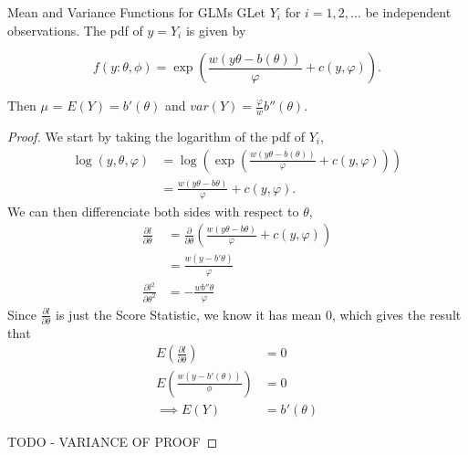 \begin{theorem}{Mean and Variance Functions for GLMs}
    GLet $Y_i$ for $i = 1,2,\ldots$ be independent observations. The pdf of $y = Y_i$ is given by 

    \[
    f(y:\theta,\phi) = \exp\left( \frac{w(y\theta - b(\theta))}{\varphi} + c(y, \varphi)\right). 
    \]

    Then $\mu$ = $E(Y) = b'(\theta)$ and $var(Y) = \frac{\varphi}{w}b''(\theta)$.
\end{theorem}
\begin{proof}
    We start by taking the logarithm of the pdf of $Y_i$,
    \begin{align*}
        \log(y, \theta, \varphi) &= \log(\exp\left( \frac{w(y\theta - b(\theta))}{\varphi} + c(y, \varphi)\right)) \\
                                 &= \frac{w(y\theta - b\theta)}{\varphi} + c(y, \varphi).
    \end{align*}
    We can then differenciate both sides with respect to $\theta$,
    \begin{align*}
        \frac{\partial l}{\partial \theta} &= \frac{\partial }{\partial \theta} \left(\frac{w(y\theta - b\theta)}{\varphi} + c(y, \varphi) \right) \\
        &= \frac{w(y - b'\theta)}{\varphi}  \\
        \frac{\partial l^2}{\partial \theta^2} &= -\frac{wb''\theta}{\varphi}
    \end{align*}
    Since $\frac{\partial l}{\partial \theta}$ is just the Score Statistic, we know it has mean 0, which gives the result that 
    \begin{align*}
        E\left( \frac{\partial l}{\partial \theta}\right)  &= 0 \\ 
        E\left( \frac{w(y-b'(\theta))}{\phi}\right) &= 0 \\
        \implies E(Y) &= b'(\theta)
    \end{align*}

    TODO - VARIANCE OF PROOF
\end{proof}